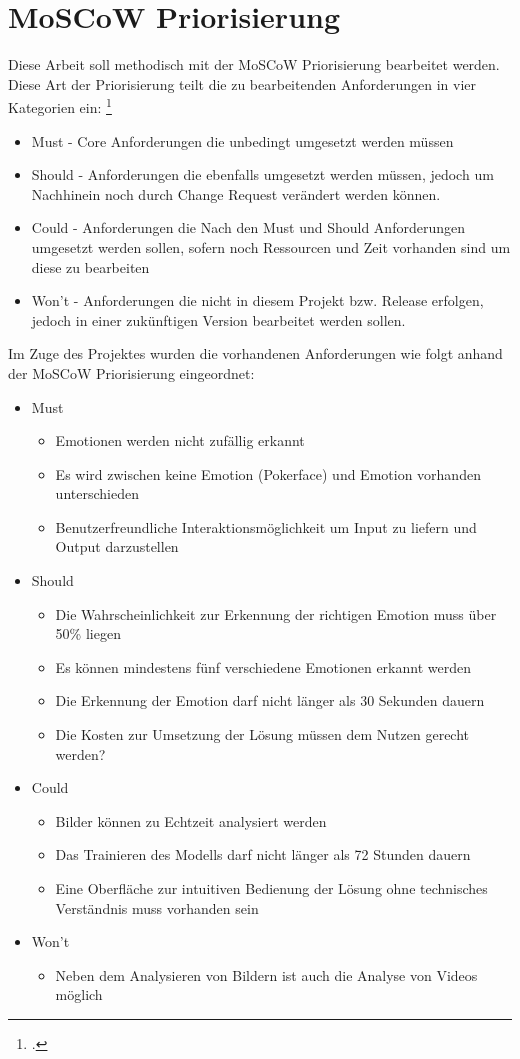 \documentclass[12pt, a4paper]{scrbook}
\begin{document}
\section{MoSCoW Priorisierung}
Diese Arbeit soll methodisch mit der MoSCoW Priorisierung bearbeitet werden. Diese Art der Priorisierung teilt die zu bearbeitenden Anforderungen in vier Kategorien ein:
\footcite[vgl.][90]{Projektmanagement}
\begin{itemize}
\item Must - Core Anforderungen die unbedingt umgesetzt werden müssen
\item Should - Anforderungen die ebenfalls umgesetzt werden müssen, jedoch um Nachhinein noch durch Change Request verändert werden können.
\item Could - Anforderungen die Nach den Must und Should Anforderungen umgesetzt werden sollen, sofern noch Ressourcen und Zeit vorhanden sind um diese zu bearbeiten
\item Won't - Anforderungen die nicht in diesem Projekt bzw. Release erfolgen, jedoch in einer zukünftigen Version bearbeitet werden sollen. 
\end{itemize}
Im Zuge des Projektes wurden die vorhandenen Anforderungen wie folgt anhand der MoSCoW Priorisierung eingeordnet:
\begin{itemize}
\item Must
\begin{itemize}
\item Emotionen werden nicht zufällig erkannt
\item Es wird zwischen keine Emotion (Pokerface) und Emotion vorhanden unterschieden
\item Benutzerfreundliche Interaktionsmöglichkeit um Input zu liefern und Output darzustellen
\end{itemize}
\item Should
\begin{itemize}
\item Die Wahrscheinlichkeit zur Erkennung der richtigen Emotion muss über 50\% liegen
\item Es können mindestens fünf verschiedene Emotionen erkannt werden
\item Die Erkennung der Emotion darf nicht länger als 30 Sekunden dauern
\item Die Kosten zur Umsetzung der Lösung müssen dem Nutzen gerecht werden?
\end{itemize}
\item Could
\begin{itemize}
\item Bilder können zu Echtzeit analysiert werden
\item Das Trainieren des Modells darf nicht länger als 72 Stunden dauern
\item Eine Oberfläche zur intuitiven Bedienung der Lösung ohne technisches Verständnis muss vorhanden sein
\end{itemize}
\item Won't
\begin{itemize}
\item Neben dem Analysieren von Bildern ist auch die Analyse von Videos möglich
\end{itemize}
\end{itemize}
\end{document}

